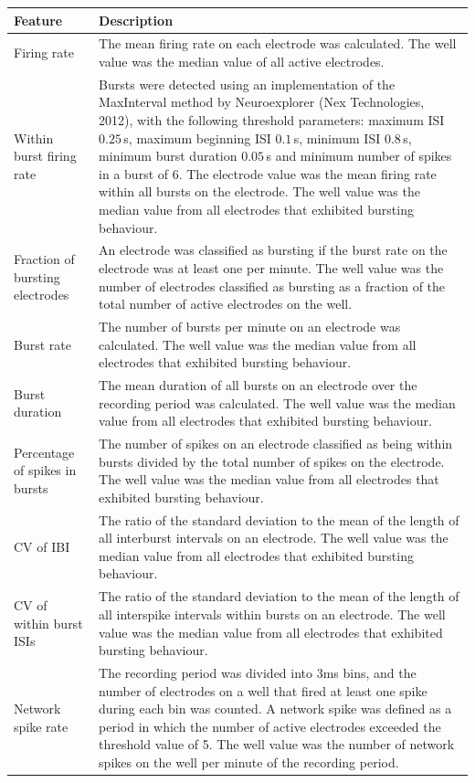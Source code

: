 \documentclass{article}
\begin{document}
\begin{table}
  \centering
  	\begin{tabular}{|l|m{11cm}|}
  		\hline
  		Feature & Description
  		\\ \hline 
  		Firing rate & The mean firing rate on each electrode was calculated. The well value was the median value of all active electrodes.
  		\\ Within burst firing rate & Bursts were detected using an implementation of the MaxInterval method by Neuroexplorer (Nex Technologies, 2012), with the following threshold parameters: maximum ISI $0.25\,$s, maximum beginning ISI $0.1\,$s, minimum ISI $0.8\,$s, minimum burst duration $0.05\,$s and minimum number of spikes in a burst of 6. The electrode value was the mean firing rate within all bursts on the electrode. The well value was the median  value from all electrodes that exhibited bursting behaviour.
  		\\ Fraction of bursting electrodes & An electrode was classified as bursting if the burst rate on the electrode was at least one per minute. The well value was the number of electrodes classified as bursting as a fraction of the total number of active electrodes on the well. 
  		\\ Burst rate & The number of bursts per minute on an electrode was calculated. The well value was the median value from all electrodes that exhibited bursting behaviour. 
  		\\ Burst duration  & The mean duration of all bursts on an electrode over the recording period was calculated. The well value was the median value from all electrodes that exhibited bursting behaviour. 
  		\\ Percentage of spikes in bursts & The number of spikes on an electrode classified as being within bursts divided by the total number of spikes on the electrode. The well value was the median value from all electrodes that exhibited bursting behaviour. 
  		\\ CV of IBI & The ratio of the standard deviation to the mean of the length of all interburst intervals on an electrode. The well value was the median value from all electrodes that exhibited bursting behaviour. 
  		\\ CV of within burst ISIs &  The ratio of the standard deviation to the mean of the length of all interspike intervals within bursts on an electrode. The well value was the median value from all electrodes that exhibited bursting behaviour. 
  		\\ Network spike rate & The recording period was divided into 3ms bins, and the number of electrodes on a well that fired at least one spike during each bin was counted. A network spike was defined as a period in which the number of active electrodes exceeded the threshold value of 5. The well value was the number of network spikes on the well per minute of the recording period.

\end{tabular}
\end{table}
\end{document}
